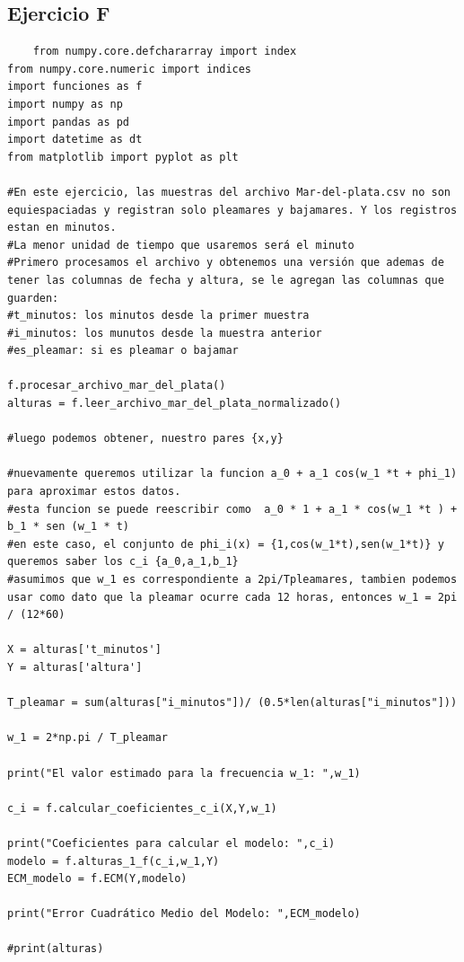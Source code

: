 \documentclass[10pt,a4paper]{article}
\numberwithin{equation}{section}
\numberwithin{figure}{section}
\numberwithin{table}{section}
\begin{document}
\subsection{Ejercicio F}
\begin{verbatim}
    from numpy.core.defchararray import index
from numpy.core.numeric import indices
import funciones as f
import numpy as np
import pandas as pd
import datetime as dt
from matplotlib import pyplot as plt

#En este ejercicio, las muestras del archivo Mar-del-plata.csv no son equiespaciadas y registran solo pleamares y bajamares. Y los registros estan en minutos. 
#La menor unidad de tiempo que usaremos será el minuto
#Primero procesamos el archivo y obtenemos una versión que ademas de tener las columnas de fecha y altura, se le agregan las columnas que guarden:
#t_minutos: los minutos desde la primer muestra
#i_minutos: los munutos desde la muestra anterior
#es_pleamar: si es pleamar o bajamar

f.procesar_archivo_mar_del_plata()
alturas = f.leer_archivo_mar_del_plata_normalizado()

#luego podemos obtener, nuestro pares {x,y}

#nuevamente queremos utilizar la funcion a_0 + a_1 cos(w_1 *t + phi_1) para aproximar estos datos.
#esta funcion se puede reescribir como  a_0 * 1 + a_1 * cos(w_1 *t ) + b_1 * sen (w_1 * t)
#en este caso, el conjunto de phi_i(x) = {1,cos(w_1*t),sen(w_1*t)} y queremos saber los c_i {a_0,a_1,b_1}
#asumimos que w_1 es correspondiente a 2pi/Tpleamares, tambien podemos usar como dato que la pleamar ocurre cada 12 horas, entonces w_1 = 2pi / (12*60)

X = alturas['t_minutos']
Y = alturas['altura']

T_pleamar = sum(alturas["i_minutos"])/ (0.5*len(alturas["i_minutos"]))

w_1 = 2*np.pi / T_pleamar

print("El valor estimado para la frecuencia w_1: ",w_1)

c_i = f.calcular_coeficientes_c_i(X,Y,w_1)

print("Coeficientes para calcular el modelo: ",c_i)
modelo = f.alturas_1_f(c_i,w_1,Y)
ECM_modelo = f.ECM(Y,modelo)

print("Error Cuadrático Medio del Modelo: ",ECM_modelo)

#print(alturas)

\end{verbatim}
\end{document}
